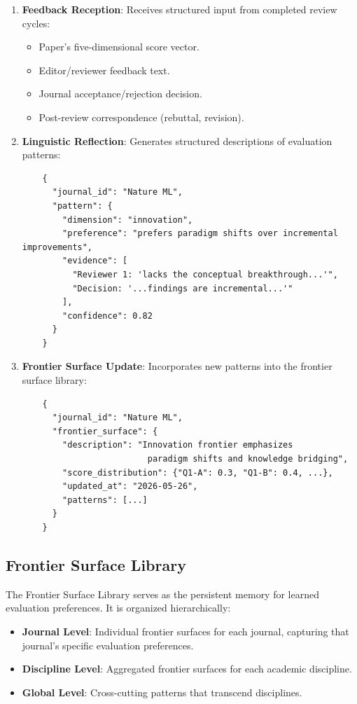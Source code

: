 \begin{enumerate}
    \item \textbf{Feedback Reception}: Receives structured input from completed review cycles:
    \begin{itemize}
        \item Paper's five-dimensional score vector.
        \item Editor/reviewer feedback text.
        \item Journal acceptance/rejection decision.
        \item Post-review correspondence (rebuttal, revision).
    \end{itemize}
    \item \textbf{Linguistic Reflection}: Generates structured descriptions of evaluation patterns:
    \begin{verbatim}
    {
      "journal_id": "Nature ML",
      "pattern": {
        "dimension": "innovation",
        "preference": "prefers paradigm shifts over incremental improvements",
        "evidence": [
          "Reviewer 1: 'lacks the conceptual breakthrough...'", 
          "Decision: '...findings are incremental...'"
        ],
        "confidence": 0.82
      }
    }
    \end{verbatim}
    \item \textbf{Frontier Surface Update}: Incorporates new patterns into the frontier surface library:
    \begin{verbatim}
    {
      "journal_id": "Nature ML",
      "frontier_surface": {
        "description": "Innovation frontier emphasizes 
                         paradigm shifts and knowledge bridging",
        "score_distribution": {"Q1-A": 0.3, "Q1-B": 0.4, ...},
        "updated_at": "2026-05-26",
        "patterns": [...]
      }
    }
    \end{verbatim}
\end{enumerate}

\subsection{Frontier Surface Library}

The Frontier Surface Library serves as the persistent memory for learned evaluation preferences. It is organized hierarchically:

\begin{itemize}
    \item \textbf{Journal Level}: Individual frontier surfaces for each journal, capturing that journal's specific evaluation preferences.
    \item \textbf{Discipline Level}: Aggregated frontier surfaces for each academic discipline.
    \item \textbf{Global Level}: Cross-cutting patterns that transcend disciplines.
\end{itemize}


